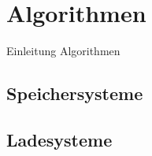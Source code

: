 \chapter{Algorithmen}\label{ch:algorithmen}

Einleitung Algorithmen

\section{Speichersysteme}
\section{Ladesysteme}
